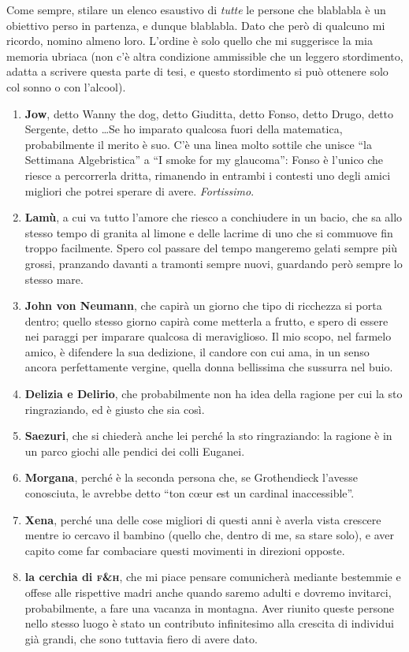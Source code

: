 Come sempre, stilare un elenco esaustivo di \emph{tutte} le persone che bla\-bla\-bla è un obiettivo perso in partenza, e dunque bla\-bla\-bla. Dato che però di qualcuno mi ricordo, nomino almeno loro. L'ordine è solo quello che mi suggerisce la mia memoria ubriaca (non c'è altra condizione ammissible che un leggero stordimento, adatta a scrivere questa parte di tesi, e questo stordimento si può ottenere solo col sonno o con l'alcool).
\begin{enumerate}
\item {\bf Jow}, detto Wanny the dog, detto Giuditta, detto Fonso, detto Drugo, detto Sergente, detto \dots Se ho imparato qualcosa fuori della matematica, probabilmente il merito è suo. C'è una linea molto sottile che unisce ``la Settimana Algebristica'' a ``I smoke for my glaucoma'': Fonso è l'unico che riesce a percorrerla dritta, rimanendo in entrambi i contesti uno degli amici migliori che potrei sperare di avere. \emph{Fortissimo}.
\item {\bf Lamù}, a cui va tutto l'amore che riesco a conchiudere in un bacio, che sa allo stesso tempo di granita al limone e delle lacrime di uno che si commuove fin troppo facilmente. Spero col passare del tempo mangeremo gelati sempre più grossi, pranzando davanti a tramonti sempre nuovi, guardando però sempre lo stesso mare.
\item {\bf John von Neumann}, che capirà un giorno che tipo di ricchezza si porta dentro; quello stesso giorno capirà come metterla a frutto, e spero di essere nei paraggi per imparare qualcosa di meraviglioso. Il mio scopo, nel farmelo amico, è difendere la sua dedizione, il candore con cui ama, in un senso ancora perfettamente vergine, quella donna bellissima che sussurra nel buio.
\item {\bf Delizia e Delirio}, che probabilmente non ha idea della ragione per cui la sto ringraziando, ed è giusto che sia così.
\item {\bf Saezuri}, che si chiederà anche lei perché la sto ringraziando: la ragione è in un parco giochi alle pendici dei colli Euganei.
\item {\bf Morgana}, perché è la seconda persona che, se Grothendieck l'avesse conosciuta, le avrebbe detto ``ton c{\oe}ur est un cardinal inaccessible''.
\item {\bf Xena}, perché una delle cose migliori di questi anni è averla vista crescere mentre io cercavo il bambino (quello che, dentro di me, sa stare solo), e aver capito come far combaciare questi movimenti in direzioni opposte.
\item {\bf la cerchia di \textsc{f}\&\textsc{h}}, che mi piace pensare comunicherà mediante bestemmie e offese alle rispettive madri anche quando saremo adulti e dovremo invitarci, probabilmente, a fare una vacanza in montagna. Aver riunito queste persone nello stesso luogo è stato un contributo infinitesimo alla crescita di individui già grandi, che sono tuttavia fiero di avere dato.

\end{enumerate}
